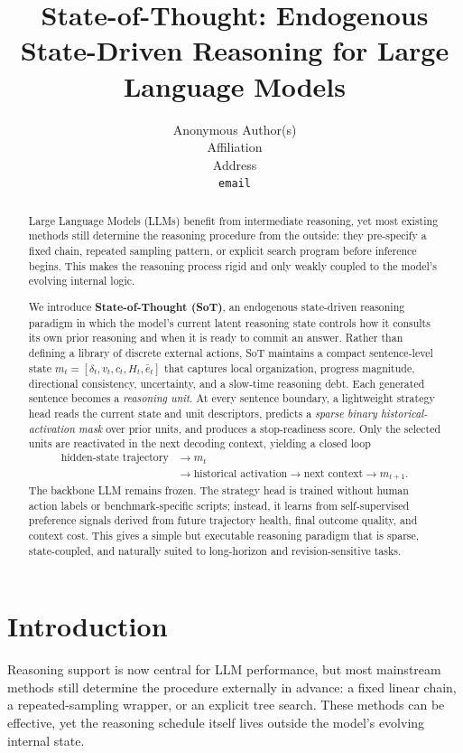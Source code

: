 \documentclass{article}
\title{State-of-Thought: Endogenous State-Driven Reasoning for Large Language Models}
\author{%
  Anonymous Author(s) \\
  Affiliation \\
  Address \\
  \texttt{email}
}
\begin{document}
\maketitle

\begin{abstract}
Large Language Models (LLMs) benefit from intermediate reasoning, yet most existing methods still determine the reasoning procedure from the outside: they pre-specify a fixed chain, repeated sampling pattern, or explicit search program before inference begins. This makes the reasoning process rigid and only weakly coupled to the model's evolving internal logic.

We introduce \textbf{State-of-Thought (SoT)}, an endogenous state-driven reasoning paradigm in which the model's current latent reasoning state controls how it consults its own prior reasoning and when it is ready to commit an answer. Rather than defining a library of discrete external actions, SoT maintains a compact sentence-level state $m_t=[\delta_t,v_t,c_t,H_t,\bar e_t]$ that captures local organization, progress magnitude, directional consistency, uncertainty, and a slow-time reasoning debt. Each generated sentence becomes a \emph{reasoning unit}. At every sentence boundary, a lightweight strategy head reads the current state and unit descriptors, predicts a \emph{sparse binary historical-activation mask} over prior units, and produces a stop-readiness score. Only the selected units are reactivated in the next decoding context, yielding a closed loop
\[
\begin{aligned}
\text{hidden-state trajectory}
&\rightarrow m_t \\
&\rightarrow \text{historical activation}
\rightarrow \text{next context}
\rightarrow m_{t+1}.
\end{aligned}
\]
The backbone LLM remains frozen. The strategy head is trained without human action labels or benchmark-specific scripts; instead, it learns from self-supervised preference signals derived from future trajectory health, final outcome quality, and context cost. This gives a simple but executable reasoning paradigm that is sparse, state-coupled, and naturally suited to long-horizon and revision-sensitive tasks.
\end{abstract}

\section{Introduction}
\label{sec:intro}

Reasoning support is now central for LLM performance, but most mainstream methods still determine the procedure externally in advance: a fixed linear chain, a repeated-sampling wrapper, or an explicit tree search. These methods can be effective, yet the reasoning schedule itself lives outside the model's evolving internal state.
\end{document}
